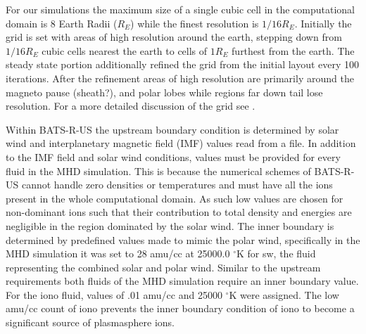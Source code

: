 \documentclass[utf8]{frontiersinFPHY_FAMS}
\begin{document}
 For our simulations the maximum size of a single cubic cell in the computational domain is 8 Earth Radii ($R_{E}$) while the finest resolution is $1/16 R_{E}$. Initially the grid is set with areas of high resolution around the earth, stepping down from $1/16 R_{E}$ cubic cells nearest the earth to cells of $1 R_{E}$ furthest from the earth. The steady state portion additionally refined the grid from the initial layout every 100 iterations. After the refinement areas of high resolution are primarily around the magneto pause (sheath?), and polar lobes while regions far down tail lose resolution. For a more detailed discussion of the grid see \citet[Welling and Liemohn(2014)]{Welling2014}.

Within BATS-R-US the upstream boundary condition is determined by solar wind and interplanetary magnetic field (IMF) values read from a file. In addition to the IMF field and solar wind conditions, values must be provided for every fluid in the MHD simulation. This is because the numerical schemes of BATS-R-US cannot handle zero densities or temperatures and must have all the ions present in the whole computational domain. As such low values are chosen for non-dominant ions such that their contribution to total density and energies are negligible in the region dominated by the solar wind. The inner boundary is determined by predefined values made to mimic the polar wind, specifically in the MHD simulation it was set to 28 amu/cc at 25000.0 $^{\circ}$K for sw, the fluid representing the combined solar and polar wind. Similar to the upstream requirements both fluids of the MHD simulation require an inner boundary value. For the iono fluid, values of .01 amu/cc and 25000 $^{\circ}$K were assigned. The low amu/cc count of iono prevents the inner boundary condition of iono to become a significant source of plasmasphere ions. 



\end{document}
